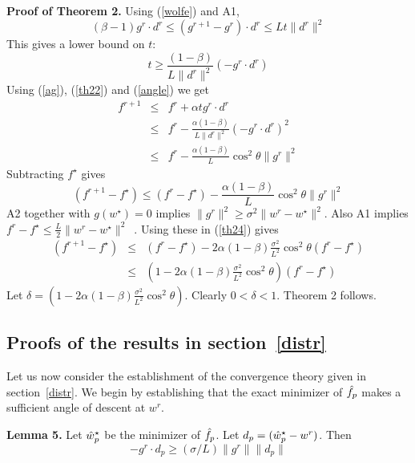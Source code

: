 {\bf Proof of Theorem 2.} Using (\ref{wolfe}) and A1,
\begin{equation}
(\beta-1)g^r\cdot d^r \le (g^{r+1}-g^r)\cdot d^r \le Lt\|d^r\|^2
\label{th21}
\end{equation}
This gives a lower bound on $t$:
\begin{equation}
t \ge \frac{(1-\beta)}{L\|d^r\|^2} (-g^r\cdot d^r)
\label{th22}
\end{equation}
Using (\ref{ag}), (\ref{th22}) and (\ref{angle}) we get
\begin{eqnarray}
f^{r+1} & \le & f^r + \alpha t g^r\cdot d^r \nonumber \\
        & \le & f^r - \frac{\alpha(1-\beta)}{L\|d^r\|^2} (-g^r\cdot d^r)^2 \nonumber \\
        & \le & f^r - \frac{\alpha(1-\beta)}{L} \cos^2 \theta \|g^r\|^2
\label{th23}
\end{eqnarray}
Subtracting $f^\star$ gives
\begin{equation}
(f^{r+1} - f^\star) \le  (f^r-f^\star) - \frac{\alpha(1-\beta)}{L} \cos^2 \theta \|g^r\|^2
\label{th24}
\end{equation}
A2 together with $g(w^\star)=0$ implies $\|g^r\|^2\ge\sigma^2\|w^r-w^\star\|^2$. Also A1 implies $f^r-f^\star \le \frac{L}{2}\|w^r-w^\star\|^2$~\cite{smola2008}. Using these in (\ref{th24}) gives
\begin{eqnarray}
(f^{r+1}-f^\star) & \le & (f^r - f^\star) - 2\alpha(1-\beta)\frac{\sigma^2}{L^2} \cos^2\theta (f^r - f^\star) \nonumber \\
                  & \le & (1 - 2\alpha(1-\beta)\frac{\sigma^2}{L^2} \cos^2\theta) (f^r - f^\star)
\label{th25}
\end{eqnarray}
Let $\delta = (1 - 2\alpha(1-\beta)\frac{\sigma^2}{L^2} \cos^2\theta)$. Clearly $0 < \delta < 1$. Theorem 2 follows.

\subsection{Proofs of the results in section~\ref{distr}}

Let us now consider the establishment of the convergence theory given in section~\ref{distr}. We begin by establishing that the exact minimizer of $\hat{f}_p$ makes a sufficient angle of descent at $w^r$.

{\bf Lemma 5.} Let $\hat{w}_p^\star$ be the minimizer of $\hat{f}_p$. Let $d_p= (\hat{w}_p^\star-w^r)$. Then
\begin{equation}
-g^r\cdot d_p \ge (\sigma/L) \|g^r\| \|d_p\|
\label{suffangle}
\end{equation}


